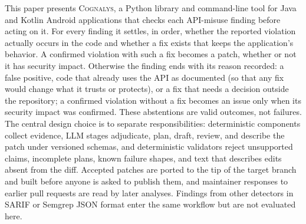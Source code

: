 \documentclass[conference]{IEEEtran}
\newcommand{\system}{\textsc{Cognalys}}
\begin{document}
This paper presents \system, a Python library and command-line tool for Java
and Kotlin Android applications that checks each API-misuse finding before
acting on it. For every finding it settles, in order, whether the reported
violation actually occurs in the code and whether a fix exists that keeps the
application's behavior. A confirmed violation with such a fix becomes a patch,
whether or not it has security impact. Otherwise the finding ends with its
reason recorded: a false positive, code that already uses the API as documented
(so that any fix would change what it trusts or protects), or a fix that needs
a decision outside the repository; a confirmed violation without a fix becomes
an issue only when its security impact was confirmed. These abstentions are
valid outcomes, not failures. The central design choice is to separate
responsibilities: deterministic components collect evidence, LLM stages
adjudicate, plan, draft, review, and describe the patch under versioned
schemas, and deterministic validators reject unsupported claims, incomplete
plans, known failure shapes, and text that describes edits absent from the
diff. Accepted patches are ported to the tip of the target branch and built
before anyone is asked to publish them, and maintainer responses to earlier
pull requests are read by later analyses. Findings from other detectors in
SARIF or Semgrep JSON format enter the same workflow but are not evaluated
here.
\end{document}
